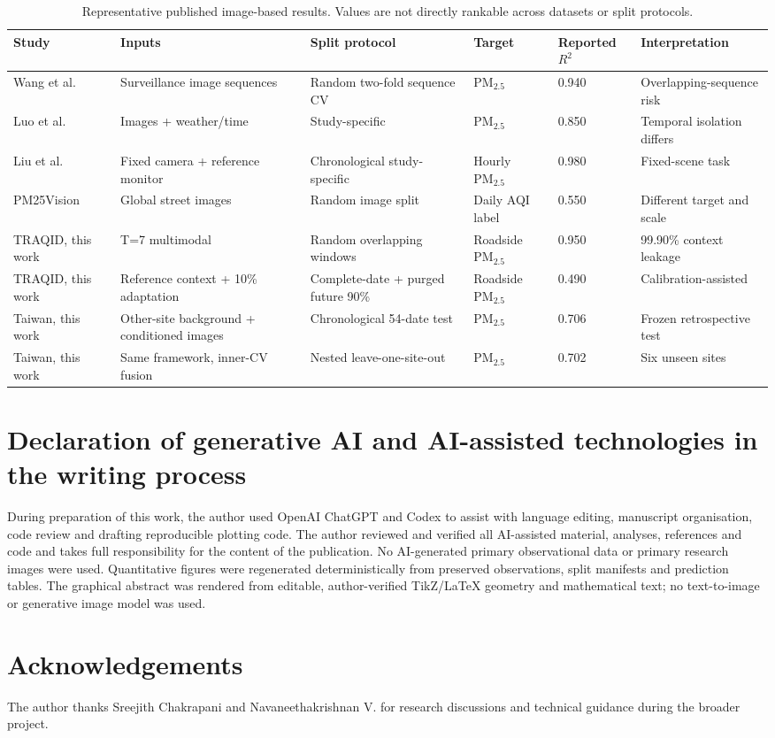 \documentclass[review,12pt,authoryear]{elsarticle}
\newcommand{\PM}[1]{\ensuremath{\mathrm{PM}_{#1}}}
\newcommand{\pmfine}{\PM{2.5}}
\newcommand{\Rtwo}{\ensuremath{R^2}}
\begin{document}
\begin{table}[H]
\centering
\caption{Representative published image-based results. Values are not directly
rankable across datasets or split protocols.}
\label{tab:literature}
\begin{adjustbox}{max width=\textwidth}
\begin{tabular}{P{2.5cm}P{3.2cm}P{3.0cm}P{2.4cm}P{2.2cm}P{3.4cm}}
\toprule
Study & Inputs & Split protocol & Target & Reported \Rtwo & Interpretation \\
\midrule
Wang et al.~\citep{wang2024surveillance} & Surveillance image sequences & Random two-fold sequence CV & \pmfine{} & 0.940 & Overlapping-sequence risk \\
Luo et al.~\citep{luo2020cnn} & Images + weather/time & Study-specific & \pmfine{} & 0.850 & Temporal isolation differs \\
Liu et al.~\citep{liu2024trafficcamera} & Fixed camera + reference monitor & Chronological study-specific & Hourly \pmfine{} & 0.980 & Fixed-scene task \\
PM25\-Vision~\citep{han2026pm25vision} & Global street images & Random image split & Daily AQI label & 0.550 & Different target and scale \\
TRAQID, this work & T=7 multimodal & Random overlapping windows & Roadside \pmfine{} & 0.950 & 99.90\% context leakage \\
TRAQID, this work & Reference context + 10\% adaptation & Complete-date + purged future 90\% & Roadside \pmfine{} & 0.490 & Calibration-assisted \\
Taiwan, this work & Other-site background + conditioned images & Chronological 54-date test & \pmfine{} & 0.706 & Frozen retrospective test \\
Taiwan, this work & Same framework, inner-CV fusion & Nested leave-one-site-out & \pmfine{} & 0.702 & Six unseen sites \\
\bottomrule
\end{tabular}
\end{adjustbox}
\end{table}

\section*{Declaration of generative AI and AI-assisted technologies in the
writing process}
During preparation of this work, the author used OpenAI ChatGPT and Codex to
assist with language editing, manuscript organisation, code review and drafting
reproducible plotting code. The author reviewed and verified all AI-assisted
material, analyses, references and code and takes full responsibility for the
content of the publication. No AI-generated primary observational data or
primary research images were used. Quantitative figures were regenerated
deterministically from preserved observations, split manifests and prediction
tables. The graphical abstract was rendered from editable, author-verified
TikZ/LaTeX geometry and mathematical text; no text-to-image or generative image
model was used.

\section*{Acknowledgements}
The author thanks Sreejith Chakrapani and Navaneethakrishnan V. for research
discussions and technical guidance during the broader project.



\end{document}
